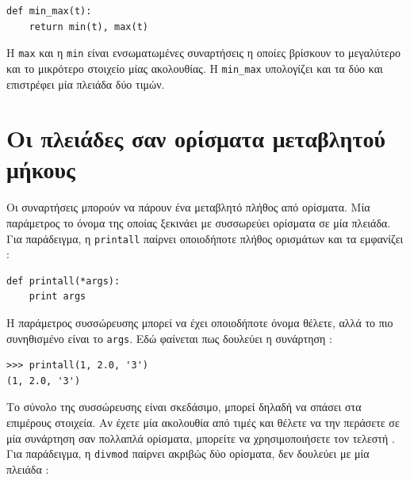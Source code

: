 \documentclass[10pt]{book}
\begin{document}
\begin{verbatim}
def min_max(t):
    return min(t), max(t)
\end{verbatim}
%
 Η  {\tt max}  και η  {\tt min}  είναι ενσωματωμένες συναρτήσεις η οποίες βρίσκουν το μεγαλύτερο και το μικρότερο στοιχείο μίας ακολουθίας. Η  \verb"min_max"  υπολογίζει και τα δύο και επιστρέφει μία πλειάδα δύο τιμών.


 
\section{Οι πλειάδες σαν ορίσματα μεταβλητού μήκους}

Οι συναρτήσεις μπορούν να πάρουν ένα μεταβλητό πλήθος από ορίσματα. Μία παράμετρος το όνομα της οποίας ξεκινάει με  {\tt *}  συσσωρεύει ορίσματα σε μία πλειάδα. Για παράδειγμα, η  {\tt printall}  παίρνει οποιοδήποτε πλήθος ορισμάτων και τα εμφανίζει  :

\begin{verbatim}
def printall(*args):
    print args
\end{verbatim}
%
 Η παράμετρος συσσώρευσης μπορεί να έχει οποιοδήποτε όνομα θέλετε, αλλά το πιο συνηθισμένο είναι το  {\tt args}.  Εδώ φαίνεται πως δουλεύει η συνάρτηση :

\begin{verbatim}
>>> printall(1, 2.0, '3')
(1, 2.0, '3')
\end{verbatim}
%
 Το σύνολο της συσσώρευσης είναι σκεδάσιμο, μπορεί δηλαδή να σπάσει στα επιμέρους στοιχεία. Αν έχετε μία ακολουθία από τιμές και θέλετε να την περάσετε σε μία συνάρτηση σαν πολλαπλά ορίσματα, μπορείτε να χρησιμοποιήσετε τον τελεστή  {\tt *}.  Για παράδειγμα, η  {\tt divmod}  παίρνει ακριβώς δύο ορίσματα, δεν δουλεύει με μία πλειάδα :


%
\end{document}
